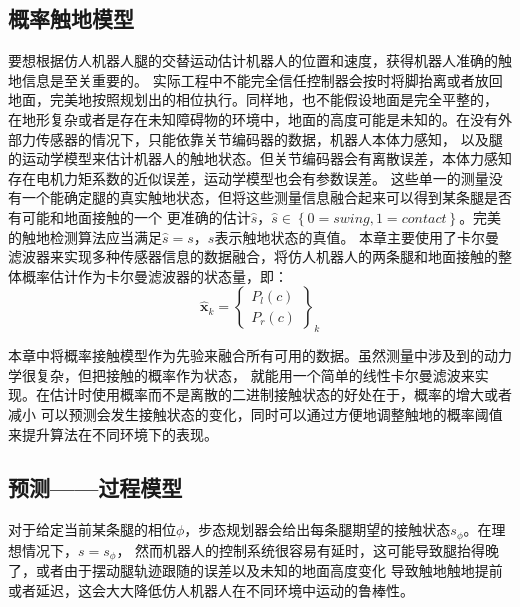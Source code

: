 \subsection{概率触地模型}
\label{sec:prob_contact}
要想根据仿人机器人腿的交替运动估计机器人的位置和速度，获得机器人准确的触地信息是至关重要的。
实际工程中不能完全信任控制器会按时将脚抬离或者放回地面，完美地按照规划出的相位执行。同样地，也不能假设地面是完全平整的，
在地形复杂或者是存在未知障碍物的环境中，地面的高度可能是未知的。在没有外部力传感器的情况下，只能依靠关节编码器的数据，机器人本体力感知，
以及腿的运动学模型来估计机器人的触地状态。但关节编码器会有离散误差，本体力感知存在电机力矩系数的近似误差，运动学模型也会有参数误差。
这些单一的测量没有一个能确定腿的真实触地状态，但将这些测量信息融合起来可以得到某条腿是否有可能和地面接触的一个
更准确的估计$\hat s$，$\hat s \in \left\{0=swing, 1=contact\right\}$。完美的触地检测算法应当满足$\hat s = s$，$s$表示触地状态的真值。
本章主要使用了卡尔曼滤波器来实现多种传感器信息的数据融合，将仿人机器人的两条腿和地面接触的整体概率估计作为卡尔曼滤波器的状态量，即：
\begin{equation}
    \label{equ:est_state}
    \hat{\boldsymbol{x}}_k=\left\{\begin{array}{c}
        P_l(c) \\
        P_r(c)
        \end{array}\right\}_k
\end{equation}

本章中将概率接触模型作为先验来融合所有可用的数据。虽然测量中涉及到的动力学很复杂，但把接触的概率作为状态，
就能用一个简单的线性卡尔曼滤波来实现。在估计时使用概率而不是离散的二进制接触状态的好处在于，概率的增大或者减小
可以预测会发生接触状态的变化，同时可以通过方便地调整触地的概率阈值来提升算法在不同环境下的表现。
\subsection{预测——过程模型}
\label{sec:contact_pred}
对于给定当前某条腿的相位$\phi$，步态规划器会给出每条腿期望的接触状态$s_{\phi}$。在理想情况下，$s = s_{\phi}$，
然而机器人的控制系统很容易有延时，这可能导致腿抬得晚了，或者由于摆动腿轨迹跟随的误差以及未知的地面高度变化
导致触地触地提前或者延迟，这会大大降低仿人机器人在不同环境中运动的鲁棒性。

